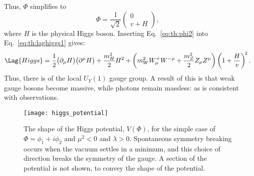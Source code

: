Thus, $\Phi$ simplifies to
\begin{equation}
  \Phi = \frac{1}{\sqrt{2}}
  \begin{pmatrix} 0 \\ v+H
  \end{pmatrix},
  \label{eq:th:phi2}
\end{equation}
where $H$ is the physical Higgs boson.
Inserting Eq.~\ref{eq:th:phi2} into Eq.~\ref{eq:th:laghiggs1} gives:
\begin{equation}
  \Lag{Higgs} =
  \frac{1}{2}\big(\partial_\mu H\big)\big(\partial^\mu H\big)
  +\frac{m_H^2}{2}H^2
  +\left(m_W^2W_\mu^+W^{-\mu} + \frac{m_Z^2}{2}Z_\mu Z^\mu\right)
  \left(1 + \frac{H}{v}\right)^{\!2}.
  \label{eq:th:laghiggs2}
\end{equation}
Thus, there is \SSB of the local $U_Y(1)$ gauge group.
A result of this is that weak gauge bosons become massive, while photons remain massless: as is
consistent with observations.

\begin{figure}
  \begin{center}
    \texttt{[image: higgs\_potential]}
    \caption[Shape of the Higgs potential]
    {
      The shape of the Higgs potential, $V(\Phi)$, for the simple case of $\Phi=\phi_1+i\phi_2$ and
      $\mu^2<0$ and $\lambda>0$.
      Spontaneous symmetry breaking occurs when the vacuum settles in a minimum, and this choice of
      direction breaks the symmetry of the gauge.
      A section of the potential is not shown, to convey the shape of the potential.
    }
    \label{fig:th:higgspot}
  \end{center}
\end{figure}

